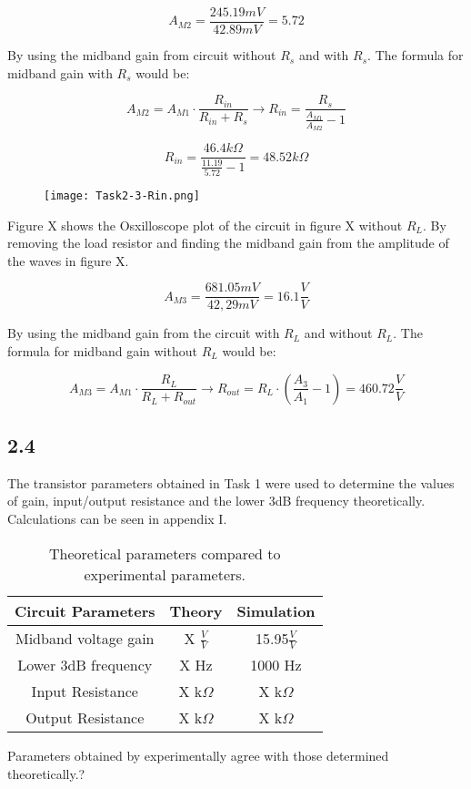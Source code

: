	$$ A_{M2} = \frac{245.19 mV}{42.89 mV} = 5.72 $$

	By using the midband gain from circuit without $R_{s}$ and with $R_{s}$. The formula for midband gain with $R_{s}$ would be:  

	$$A_{M2} = A_{M1} \cdot \frac{R_{in}}{R_{in} + R_{s}} \rightarrow R_{in} = \frac{R_{s}}{\frac{A_{M1}}{A_{M2}}-1}  $$

	$$  R_{in} = \frac{46.4 k \Omega }{\frac{11.19}{5.72}-1} = 48.52 k \Omega$$ 

	\begin{figure}[h!]
        \centering
        \texttt{[image: Task2-3-Rin.png]}
    \end{figure}

	Figure X shows the Osxilloscope plot of the circuit in figure X without $R_{L}$. By removing the load resistor and finding the midband gain from the amplitude of the waves in figure X.


	$$ A_{M3} = \frac{681.05 mV}{42,29 mV} = 16.1 \frac{V}{V} $$

	By using the midband gain from the circuit with $R_{L}$ and without $R_{L}$. The formula for midband gain without $R_{L}$ would be:


	$$ A_{M3} = A_{M1} \cdot \frac{R_{L}}{R_{L} + R_{out}} \rightarrow R_{out} = R_{L} \cdot (\frac{A_{3}}{A_{1}}-1) = 460.72 \frac{V}{V}$$






\subsection*{2.4}

The transistor parameters obtained in Task 1 were used to determine the values of gain, input/output resistance and the lower 3dB frequency theoretically. Calculations can be seen in appendix I.\\

\begin{table}[htbp]
    \centering
        \begin{tabular}{ c | c | c }
        \hline
        Circuit Parameters     &   Theory                  & Simulation \\
        \hline
        Midband voltage gain    &   X $\frac{V}{V}$    &   15.95$\frac{V}{V}$\\
        Lower 3dB frequency     &   X Hz                &   1000 Hz\\
        Input Resistance        &   X k$\Omega$           &   X k$\Omega$\\
        Output Resistance       &   X k$\Omega$            &   X k$\Omega$\\
        \end{tabular}%
    \caption{Theoretical parameters compared to experimental parameters.}
    \label{tab:addlabel}%
\end{table}%

Parameters obtained by experimentally agree with those determined theoretically.?
